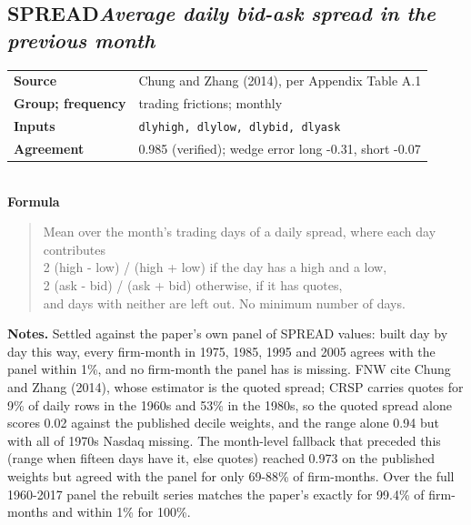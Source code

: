 \documentclass[11pt]{article}
\begin{document}
\subsection*{SPREAD\quad\normalfont\itshape Average daily bid-ask spread in the previous month}
\begin{tabular}{@{}p{3.3cm}p{12.3cm}@{}}
\textbf{Source} & Chung and Zhang (2014), per Appendix Table A.1\\
\textbf{Group; frequency} & trading frictions; monthly\\
\textbf{Inputs} & \texttt{dlyhigh, dlylow, dlybid, dlyask}\\
\textbf{Agreement} & 0.985 (verified); wedge error long -0.31, short -0.07\\
\end{tabular}\\[4pt]
\textbf{Formula}
\begin{quote}\small
Mean over the month's trading days of a daily spread, where each day contributes\\
    2 (high - low) / (high + low)       if the day has a high and a low,\\
    2 (ask - bid) / (ask + bid)         otherwise, if it has quotes,\\
and days with neither are left out. No minimum number of days.\\

\end{quote}
\textbf{Notes.} Settled against the paper's own panel of SPREAD values: built day by day this way, every firm-month in 1975, 1985, 1995 and 2005 agrees with the panel within 1\%, and no firm-month the panel has is missing. FNW cite Chung and Zhang (2014), whose estimator is the quoted spread; CRSP carries quotes for 9\% of daily rows in the 1960s and 53\% in the 1980s, so the quoted spread alone scores 0.02 against the published decile weights, and the range alone 0.94 but with all of 1970s Nasdaq missing. The month-level fallback that preceded this (range when fifteen days have it, else quotes) reached 0.973 on the published weights but agreed with the panel for only 69-88\% of firm-months. Over the full 1960-2017 panel the rebuilt series matches the paper's exactly for 99.4\% of firm-months and within 1\% for 100\%.
\end{document}

